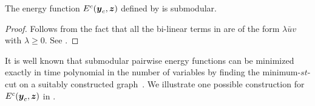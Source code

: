 \documentclass[10pt,journal,letterpaper,compsoc]{IEEEtran}
\renewcommand{\citename}{\citet}
\renewcommand{\cite}{\citep}
\newtheorem{defn}[thm]{Definition}
\begin{document}

\begin{proposition}
  The energy function $E^c({\boldsymbol{y}}_c, {\boldsymbol{z}})$ defined by
   is submodular.
  \label{prop:submod}
\end{proposition}

\begin{proof}
  Follows from the fact that all the bi-linear terms in
   are of the form $\lambda \bar{u}v$ with
  $\lambda \geq 0$. See \citename{Boros:MATH02}.
\end{proof}
\bigskip

It is well known that submodular pairwise energy functions can be
minimized exactly in time polynomial in the number of variables by
finding the minimum-$st$-cut on a suitably constructed
graph~\cite{Kolmogorov:PAMI04, Hammer:1965}. We illustrate one
possible construction for $E^c({\boldsymbol{y}}_c, {\boldsymbol{z}})$ in .
\end{document}
